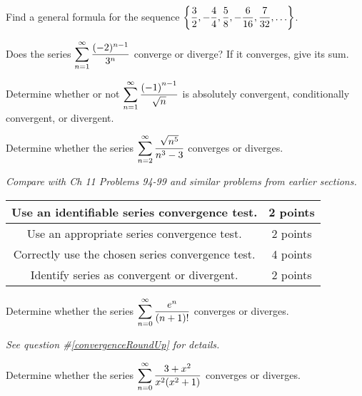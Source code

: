 \documentclass[12pt]{exam}
\newcommand{\ds}{\ensuremath{\displaystyle}}
\begin{document}
\begin{questions}

\setcounter{question}{0}

\question[10]
Find a general formula for the sequence
$
\ds \left\{
\frac{3}{2},
-\frac{4}{4},
\frac{5}{8},
-\frac{6}{16},
\frac{7}{32},
\ldots \right\}
$.

\vfill

\newpage

\question[10]
Does the series $\ds \sum_{n=1}^\infty \frac{(-2)^{n-1}}{3^n}$ converge or
diverge? If it converges, give its sum.

\vfill

\newpage

\question[10]
Determine whether or not
$\ds \sum_{n=1}^{\infty} \frac{\left(-1\right)^{n-1}}{\sqrt{n}}$
is absolutely convergent, conditionally convergent, or divergent.

\vfill

\newpage

\question[10]\label{convergenceRoundUp}
Determine whether the series
$\ds \sum_{n = 2}^{\infty} \frac{\sqrt{n^5}}{n^3-3}$
converges or diverges.

\textit{Compare with Ch 11 Problems 94-99 and similar problems from earlier
sections.}

\begin{center}
  \begin{tabular}{|c|c|}
    \hline
    Use an identifiable series convergence test. & 2 points \\
    \hline
    Use an appropriate series convergence test. & 2 points \\
    \hline
    Correctly use the chosen series convergence test. & 4 points \\
    \hline
    Identify series as convergent or divergent. & 2 points \\
    \hline
  \end{tabular}
\end{center}

\vfill

\newpage

\question[10]
Determine whether the series
$\ds \sum_{n = 0}^{\infty} \frac{e^n}{(n+1)!}$
converges or diverges.

\textit{See question \#\ref{convergenceRoundUp} for details.}

\vfill

\newpage

\question[10]
Determine whether the series
$\ds \sum_{n = 0}^{\infty} \frac{3+x^2}{x^2(x^2+1)}$
converges or diverges.


\end{questions}
\end{document}
